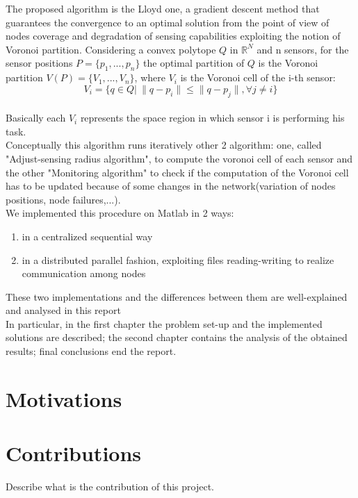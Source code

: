 \documentclass[a4paper,11pt,oneside]{book}
\begin{document}
The proposed algorithm is the Lloyd one, a gradient descent method that guarantees the convergence to an optimal solution from the point of view of nodes coverage and degradation of sensing capabilities exploiting the notion of Voronoi partition. Considering a convex polytope $Q$ in $\mathbb{R}^N$ and n sensors, for the sensor positions $P=\{p_1,...,p_n\}$ the optimal partition of $Q$ is the Voronoi partition  $V(P)=\{V_1,...,V_n\}$, where $V_i$ is the Voronoi cell of the i-th sensor: $$V_i=\{q\in Q|\> \|q-p_i\|\le\|q-p_j\|, \forall j\not= i\}$$\\
Basically each $V_i$ represents the space region in which sensor i is performing his task.\\
Conceptually this algorithm runs iteratively other 2 algorithm: one, called "Adjust-sensing radius algorithm", to compute the voronoi cell of each sensor and the other "Monitoring algorithm" to check if the computation of the Voronoi cell has to be updated because of some changes in the network(variation of nodes positions, node failures,...).\\
We implemented this procedure on Matlab in 2 ways:
\begin{enumerate}
	\item in a centralized sequential way
	\item in a distributed parallel fashion, exploiting files reading-writing to realize communication among nodes
\end{enumerate}
These two implementations and the differences between them are well-explained and analysed in this report\\
In particular, in the first chapter the problem set-up and the implemented solutions are described; the second chapter contains the analysis of the obtained results; final conclusions end the report.\\


 


 
\section*{Motivations}
\section*{Contributions}
Describe what is the contribution of this project.

\end{document}
